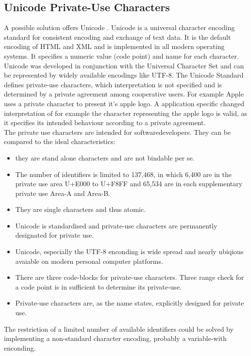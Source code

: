 \subsection{Unicode Private-Use Characters}
A possible solution offers Unicode \cite{Unicode}. Unicode is a universal character encoding standard for consistent encoding and exchange of text data. It is the default encoding of HTML and XML and is implemented in all modern operating systems. It specifies a numeric value (code point) and name for each character. Unicode was developed in conjunction with the Universal Character Set and can be represented by widely available encodings like UTF-8. The Unicode Standard defines private-use characters, which interpretation is not specified and is determined by a private agreement among cooperative users. For example Apple uses a private character to present it's apple logo. A application specific changed interpretation of for example the character representing the apple logo is valid, as it specifies its intended behaviour according to a private agreement.\\
The private use characters are intended for softwaredevelopers. They can be compared to the ideal characteristics:
\begin{itemize}
	\item they are stand alone characters and are not bindable per se.
	\item The number of identifiers is limited to 137,468, in which 6,400 are in the private use area U+E000 to U+F8FF and 65,534 are in each supplementary private use Area-A and Area-B. 
	\item They are single characters and thus atomic. 
	\item Unicode is standardised and private-use characters are permanently designated for private use.
	\item Unicode, especially the UTF-8 enconding is wide spread and nearly ubiqious avaiable on modern personal computer platforms.
	\item There are three code-blocks for private-use characters. Three range check for a code point is in sufficient to determine its private-use.
	\item Private-use characters are, as the name states, explicitly designed for private use.
\end{itemize}

The restriction of a limited number of available identifiers could be solved by implementing a non-standard character encoding, probably a variable-with enconding.

